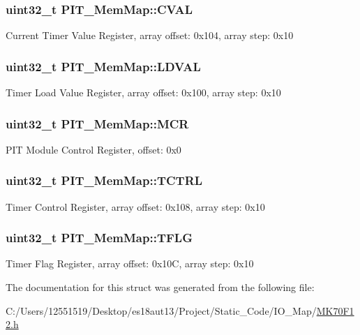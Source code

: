 \subsubsection[{C\+V\+A\+L}]{\setlength{\rightskip}{0pt plus 5cm}uint32\+\_\+t P\+I\+T\+\_\+\+Mem\+Map\+::\+C\+V\+A\+L}\label{struct_p_i_t___mem_map_a7d3d1a5913a28cfb4ca0e120ebf37087}
Current Timer Value Register, array offset\+: 0x104, array step\+: 0x10 \hypertarget{struct_p_i_t___mem_map_ad664bbe0f8b53ee1e533727db4da3fb2}{}
\subsubsection[{L\+D\+V\+A\+L}]{\setlength{\rightskip}{0pt plus 5cm}uint32\+\_\+t P\+I\+T\+\_\+\+Mem\+Map\+::\+L\+D\+V\+A\+L}\label{struct_p_i_t___mem_map_ad664bbe0f8b53ee1e533727db4da3fb2}
Timer Load Value Register, array offset\+: 0x100, array step\+: 0x10 \hypertarget{struct_p_i_t___mem_map_a99390c5764693e07c37d40ead441a7a4}{}
\subsubsection[{M\+C\+R}]{\setlength{\rightskip}{0pt plus 5cm}uint32\+\_\+t P\+I\+T\+\_\+\+Mem\+Map\+::\+M\+C\+R}\label{struct_p_i_t___mem_map_a99390c5764693e07c37d40ead441a7a4}
P\+I\+T Module Control Register, offset\+: 0x0 \hypertarget{struct_p_i_t___mem_map_a567cdea5c7d615341f95f1438020a7e1}{}
\subsubsection[{T\+C\+T\+R\+L}]{\setlength{\rightskip}{0pt plus 5cm}uint32\+\_\+t P\+I\+T\+\_\+\+Mem\+Map\+::\+T\+C\+T\+R\+L}\label{struct_p_i_t___mem_map_a567cdea5c7d615341f95f1438020a7e1}
Timer Control Register, array offset\+: 0x108, array step\+: 0x10 \hypertarget{struct_p_i_t___mem_map_add88e740d4ec7a83e66cf9ad79cd027a}{}
\subsubsection[{T\+F\+L\+G}]{\setlength{\rightskip}{0pt plus 5cm}uint32\+\_\+t P\+I\+T\+\_\+\+Mem\+Map\+::\+T\+F\+L\+G}\label{struct_p_i_t___mem_map_add88e740d4ec7a83e66cf9ad79cd027a}
Timer Flag Register, array offset\+: 0x10\+C, array step\+: 0x10 

The documentation for this struct was generated from the following file\+:\begin{DoxyCompactItemize}
\item 
C\+:/\+Users/12551519/\+Desktop/es18aut13/\+Project/\+Static\+\_\+\+Code/\+I\+O\+\_\+\+Map/\hyperlink{_m_k70_f12_8h}{M\+K70\+F12.\+h}\end{DoxyCompactItemize}
